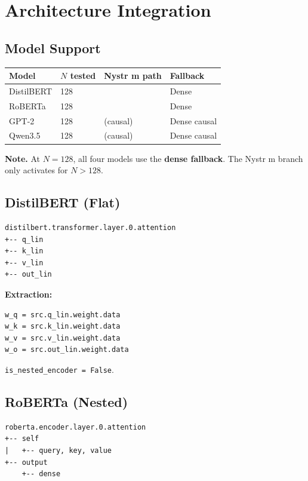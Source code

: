 
\section{Architecture Integration}

\subsection{Model Support}

\begin{table}[H]
\centering
\small
\begin{tabular}{llll}
\toprule
\textbf{Model} & \textbf{$N$ tested} & \textbf{Nystr m path} & \textbf{Fallback} \\
\midrule
DistilBERT & 128 &  & Dense \\
RoBERTa & 128 &  & Dense \\
GPT-2 & 128 & (causal) & Dense causal \\
Qwen3.5 & 128 & (causal) & Dense causal \\
\bottomrule
\end{tabular}
\end{table}

\textbf{Note.} At $N = 128$, all four models use the \textbf{dense fallback}. The 
Nystr m branch only activates for $N > 128$.

\subsection{DistilBERT (Flat)}

\begin{lstlisting}
distilbert.transformer.layer.0.attention
+-- q_lin
+-- k_lin
+-- v_lin
+-- out_lin
\end{lstlisting}

\textbf{Extraction:}
\begin{lstlisting}
w_q = src.q_lin.weight.data
w_k = src.k_lin.weight.data
w_v = src.v_lin.weight.data
w_o = src.out_lin.weight.data
\end{lstlisting}

\texttt{is\_nested\_encoder = False}.

\subsection{RoBERTa (Nested)}

\begin{lstlisting}
roberta.encoder.layer.0.attention
+-- self
|   +-- query, key, value
+-- output
    +-- dense
\end{lstlisting}

